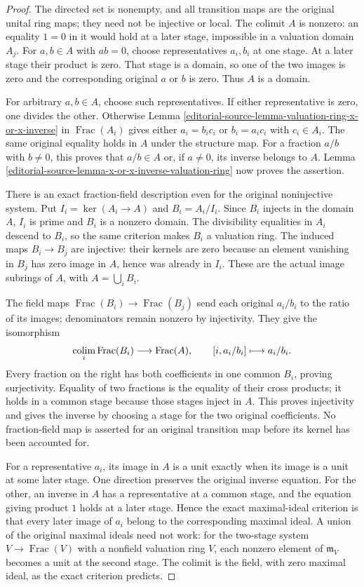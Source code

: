\begin{proof}
The directed set is nonempty,
and all transition maps are
the original unital ring maps;
they need not be injective
or local. The colimit $A$
is nonzero: an equality
$1=0$ in it would hold
at a later stage, impossible
in a valuation domain $A_j$.
For $a,b\in A$ with $ab=0$,
choose representatives $a_i,b_i$
at one stage. At a later
stage their product is zero.
That stage is a domain,
so one of the two images
is zero and the corresponding
original $a$ or $b$ is zero.
Thus $A$ is a domain.

For arbitrary $a,b\in A$,
choose such representatives.
If either representative is
zero, one divides the other.
Otherwise Lemma
\ref{editorial-source-lemma-valuation-ring-x-or-x-inverse}
in $\operatorname{Frac}(A_i)$
gives either $a_i=b_i c_i$
or $b_i=a_i c_i$ with
$c_i\in A_i$. The same
original equality holds in
$A$ under the structure map.
For a fraction $a/b$ with
$b\neq0$, this proves that
$a/b\in A$ or, if $a\neq0$,
its inverse belongs to $A$.
Lemma
\ref{editorial-source-lemma-x-or-x-inverse-valuation-ring}
now proves the assertion.

There is an exact fraction-field
description even for the original
noninjective system. Put
$I_i=\ker(A_i\to A)$ and
$B_i=A_i/I_i$. Since $B_i$
injects in the domain $A$,
$I_i$ is prime and $B_i$
is a nonzero domain. The
divisibility equalities in
$A_i$ descend to $B_i$,
so the same criterion makes
$B_i$ a valuation ring.
The induced maps $B_i\to B_j$
are injective: their kernels
are zero because an element
vanishing in $B_j$ has zero
image in $A$, hence was
already in $I_i$.
These are the actual image
subrings of $A$, with
$A=\bigcup_i B_i$.

The field maps
$\operatorname{Frac}(B_i)\to\operatorname{Frac}(B_j)$
send each original $a_i/b_i$
to the ratio of its images;
denominators remain nonzero
by injectivity. They give
the isomorphism
$$
\mathop{\rm colim}_i\operatorname{Frac}(B_i)
\longrightarrow\operatorname{Frac}(A),
\qquad[i,a_i/b_i]\longmapsto a_i/b_i.
$$
Every fraction on the right
has both coefficients in
one common $B_i$, proving
surjectivity. Equality of two
fractions is the equality
of their cross products;
it holds in a common stage
because those stages inject
in $A$. This proves injectivity
and gives the inverse by
choosing a stage for the
two original coefficients.
No fraction-field map is
asserted for an original
transition map before its
kernel has been accounted for.

For a representative $a_i$,
its image in $A$ is a unit
exactly when its image is
a unit at some later stage.
One direction preserves the
original inverse equation.
For the other, an inverse
in $A$ has a representative
at a common stage, and
the equation giving product
$1$ holds at a later stage.
Hence the exact maximal-ideal
criterion is that every
later image of $a_i$ belong
to the corresponding maximal
ideal. A union of the
original maximal ideals need
not work: for the two-stage
system $V\to\operatorname{Frac}(V)$
with a nonfield valuation
ring $V$, each nonzero
element of $\mathfrak m_V$
becomes a unit at the
second stage. The colimit
is the field, with zero
maximal ideal, as the exact
criterion predicts.
\end{proof}

